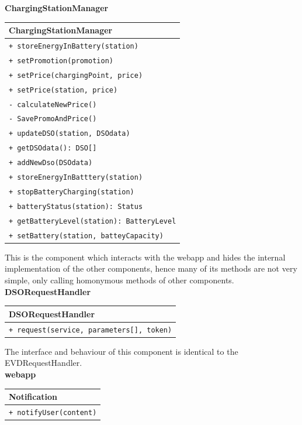 \textbf{ChargingStationManager}\\
\begin{table}[H]
    \centering
    \begin{tabular}{|l|}
        \hline
        \textbf{ChargingStationManager} \\
        \hline
        \verb|+ storeEnergyInBattery(station)|\\
        \verb|+ setPromotion(promotion)|\\
        \verb|+ setPrice(chargingPoint, price)|\\
        \verb|+ setPrice(station, price)|\\
        \verb|- calculateNewPrice()|\\
        \verb|- SavePromoAndPrice()|\\
        \verb|+ updateDSO(station, DSOdata)|\\
        \verb|+ getDSOdata(): DSO[]|\\
        \verb|+ addNewDso(DSOdata)|\\
        \verb|+ storeEnergyInBatttery(station)|\\
        \verb|+ stopBatteryCharging(station)|\\
        \verb|+ batteryStatus(station): Status|\\
        \verb|+ getBatteryLevel(station): BatteryLevel|\\
        \verb|+ setBattery(station, batteyCapacity)|\\
        \hline
    \end{tabular}
\end{table}
This is the component which interacts with the webapp and hides the internal implementation of the other components, hence many of its methods are not very simple, only calling homonymous methods of other components.\\

\textbf{DSORequestHandler}\\
\begin{table}[H]
    \centering
    \begin{tabular}{|l|}
        \hline
        \textbf{DSORequestHandler} \\
        \hline
        \verb|+ request(service, parameters[], token)|\\
        \hline
    \end{tabular}
\end{table}
The interface and behaviour of this component is identical to the EVDRequestHandler.\\
\textbf{webapp}\\
\begin{table}[H]
    \centering
    \begin{tabular}{|l|}
        \hline
        \textbf{Notification} \\
        \hline
        \verb|+ notifyUser(content)|\\
        \hline
    \end{tabular}
\end{table}

